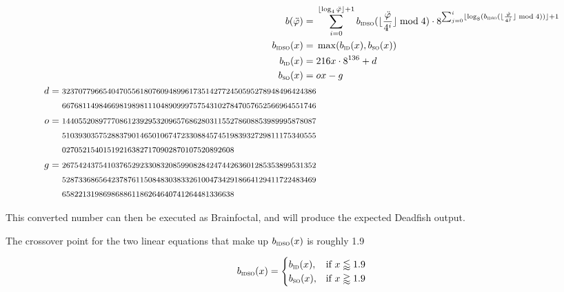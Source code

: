 \documentclass{article}
\begin{document}
\begin{align}
	b(\ddot{\varphi}) ={}& \sum_{i=0}^{\lfloor \log_4 \ddot{\varphi} \rfloor + 1} b_{\textsc{idso}}(\lfloor{\frac{\ddot{\varphi}}{4^i}}\rfloor \bmod 4) \cdot 8^{\sum_{j=0}^{i} \lfloor \log_8(b_{\textsc{idso}}(\lfloor{\frac{\ddot{\varphi}}{4^j}}\rfloor \bmod 4)) \rfloor + 1} \\
	b_{\textsc{idso}}(x) ={}& \max(b_{\textsc{id}}(x), b_{\textsc{so}}(x)) \\
	b_{\textsc{id}}(x) ={}& 216x \cdot 8^{136} + d \\
	b_{\textsc{so}}(x) ={}& ox - g \\
	\begin{split}
	d ={}& \text{\footnotesize 32370779665404705561807609489961735142772450595278948496424386} \\
	     & \text{\footnotesize 66768114984669819898111048909997575431027847057652566964551746}
	\end{split} \\
	\begin{split}
	o ={}& \text{\footnotesize 14405520897770861239295320965768628031155278608853989995878087} \\
	     & \text{\footnotesize 51039303575288379014650106747233088457451983932729811175340555} \\
	     & \text{\footnotesize 027052154015192163827170902870107520892608}
	\end{split} \\
	\begin{split}
	g ={}& \text{\footnotesize 26754243754103765292330832085990828424744263601285353899531352} \\
	     & \text{\footnotesize 52873368656423787611508483038332610047342918664129411722483469} \\
	     & \text{\footnotesize 658221319869868861186264640741264481336638}
	\end{split}
\end{align}

This converted number can then be executed as Brainfoctal, and will produce the expected Deadfish output.

The crossover point for the two linear equations that make up $b_{\textsc{idso}}(x)$ is roughly 1.9

\begin{equation}
	b_{\textsc{idso}}(x) =
		\begin{cases}
			b_{\textsc{id}}(x),& \text{if } x \lessapprox 1.9 \\
			b_{\textsc{so}}(x),& \text{if } x \gtrapprox 1.9 \\
		\end{cases}
\end{equation}
\end{document}
